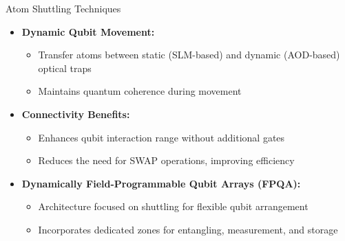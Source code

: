 
\begin{frame}{Atom Shuttling Techniques}
    \begin{itemize}
        \item \textbf{Dynamic Qubit Movement:}
        \begin{itemize}
            \item Transfer atoms between static (SLM-based) and dynamic (AOD-based) optical traps
            \item Maintains quantum coherence during movement
        \end{itemize}
        \item \textbf{Connectivity Benefits:}
        \begin{itemize}
            \item Enhances qubit interaction range without additional gates
            \item Reduces the need for SWAP operations, improving efficiency
        \end{itemize}
        \item \textbf{Dynamically Field-Programmable Qubit Arrays (FPQA):}
        \begin{itemize}
            \item Architecture focused on shuttling for flexible qubit arrangement
            \item Incorporates dedicated zones for entangling, measurement, and storage
        \end{itemize}
    \end{itemize}
\end{frame}

